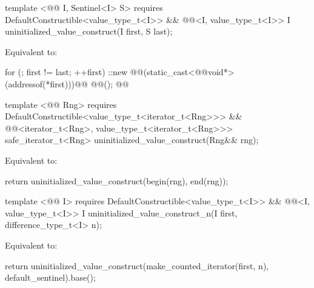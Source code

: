 {\color{addclr}
\begin{codeblock}
template <@@ I, Sentinel<I> S>
requires
  DefaultConstructible<value_type_t<I>> &&
  @@<I, value_type_t<I>>
I uninitialized_value_construct(I first, S last);
\end{codeblock}

\setcounter{Paras}{0}
\pnum
\effects Equivalent to:
} %

\begin{codeblock}
    for (; first != last; ++first)
      ::new @@(static_cast<@@void*>(addressof(*first)))@\added{)}@
        @@();
    @@
\end{codeblock}

{\color{addclr}
\begin{codeblock}
template <@@ Rng>
requires
  DefaultConstructible<value_type_t<iterator_t<Rng>>> &&
  @@<iterator_t<Rng>, value_type_t<iterator_t<Rng>>>
safe_iterator_t<Rng> uninitialized_value_construct(Rng&& rng);
\end{codeblock}

\pnum
\effects Equivalent to:
\begin{codeblock}
    return uninitialized_value_construct(begin(rng), end(rng));
\end{codeblock}

\begin{codeblock}
template <@@ I>
requires
  DefaultConstructible<value_type_t<I>> &&
  @@<I, value_type_t<I>>
I uninitialized_value_construct_n(I first, difference_type_t<I> n);
\end{codeblock}

\pnum
\effects Equivalent to:
\begin{codeblock}
    return uninitialized_value_construct(make_counted_iterator(first, n), default_sentinel{}).base();
\end{codeblock}
} %

